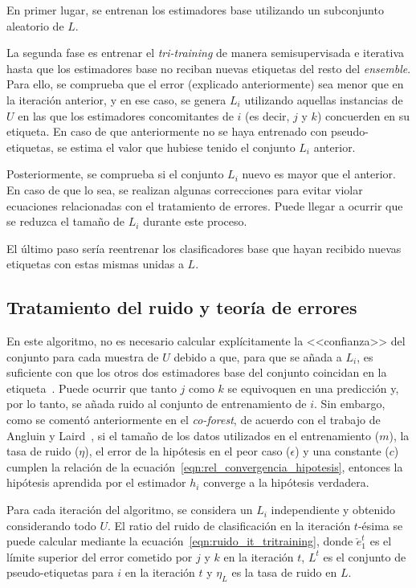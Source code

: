 En primer lugar, se entrenan los estimadores base utilizando un subconjunto aleatorio de $L$.

La segunda fase es entrenar el \textit{tri-training} de manera semisupervisada e iterativa hasta que los estimadores base no reciban nuevas etiquetas del resto del \textit{ensemble}. Para ello, se comprueba que el error (explicado anteriormente) sea menor que en la iteración anterior, y en ese caso, se genera $L_i$ utilizando aquellas instancias de $U$ en las que los estimadores concomitantes de $i$ (es decir, $j$ y $k$) concuerden en su etiqueta. En caso de que anteriormente no se haya entrenado con pseudo-etiquetas, se estima el valor que hubiese tenido el conjunto $L_i$ anterior.

Posteriormente, se comprueba si el conjunto $L_i$ nuevo es mayor que el anterior. En caso de que lo sea, se realizan algunas correcciones para evitar violar ecuaciones relacionadas con el tratamiento de errores. Puede llegar a ocurrir que se reduzca el tamaño de $L_i$ durante este proceso.

El último paso sería reentrenar los clasificadores base que hayan recibido nuevas etiquetas con estas mismas unidas a $L$.

\subsection{Tratamiento del ruido y teoría de errores}

En este algoritmo, no es necesario calcular explícitamente la <<confianza>> del conjunto para cada muestra de $U$ debido a que, para que se añada a $L_i$, es suficiente con que los otros dos estimadores base del conjunto coincidan en la etiqueta~\cite{tritraining2005@original}. Puede ocurrir que tanto $j$ como $k$ se equivoquen en una predicción y, por lo tanto, se añada ruido al conjunto de entrenamiento de $i$. Sin embargo, como se comentó anteriormente en el \textit{co-forest}, de acuerdo con el trabajo de Angluin y Laird~\cite{noisyExamplesCoforest1988Dana}, si el tamaño de los datos utilizados en el entrenamiento ($m$), la tasa de ruido ($\eta$), el error de la hipótesis en el peor caso ($\epsilon$) y una constante ($c$) cumplen la relación de la ecuación~\ref{eqn:rel_convergencia_hipotesis}, entonces la hipótesis aprendida por el estimador $h_{i}$ converge a la hipótesis verdadera.

Para cada iteración del algoritmo, se considera un $L_i$ independiente y obtenido considerando todo $U$. El ratio del ruido de clasificación en la iteración $t$-ésima se puede calcular mediante la ecuación~\ref{eqn:ruido_it_tritraining}, donde $\check{e}_{1}^{t}$ es el límite superior del error cometido por $j$ y $k$ en la iteración $t$, $L^t$ es el conjunto de pseudo-etiquetas para $i$ en la iteración $t$ y $\eta_L$ es la tasa de ruido en $L$.

